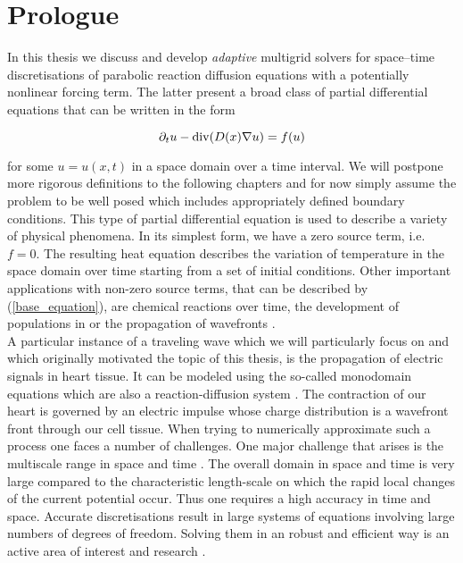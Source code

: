 \documentclass[../draft_1.tex]{subfiles}
\begin{document}
\chapter{Prologue}

In this thesis we  discuss and develop \textit{adaptive} multigrid solvers for space--time discretisations of parabolic reaction diffusion equations with a potentially nonlinear forcing term. The latter present a broad class of partial differential equations that can be written in the form
\begin{ceqn}
\begin{equation}
\label{base_equation}
\partial_t u - \mathop{}\!\mathrm{div} ( D(x) \nabla u) = f(u)
\end{equation}
\end{ceqn}
for some $u = u(x,t)$ in a space domain over a time interval. We will postpone more rigorous definitions to the following chapters and for now simply assume the problem to be well posed which includes appropriately defined boundary conditions. This type of partial differential equation is used to describe a variety of physical phenomena. In its simplest form, we have a zero source term, i.e. $f = 0$. The resulting heat equation describes the variation of temperature in the space domain over time starting from a set of initial conditions. Other important applications with non-zero source terms, that can be described by (\ref{base_equation}), are chemical reactions over time, the development of populations in \cite{cosner2008reaction} or the propagation of wavefronts \cite{zegeling2004adaptive}. 
\smallskip
\\
A particular instance of a traveling wave which we will particularly focus on and which originally motivated the topic of this thesis, is the propagation of electric signals in heart tissue. It can be modeled using the so-called monodomain equations which are also a reaction-diffusion system \cite{franzone2014mathematical}. The contraction of our heart is governed by an electric impulse whose charge distribution is a wavefront front through our cell tissue. When trying to numerically approximate such a process one faces a number of challenges. One major challenge that arises is the multiscale range in space and time \cite{colli2004parallel}. The overall domain in space and time is very large compared to the characteristic length-scale on which the rapid local changes of the current potential occur. Thus one requires a high accuracy in time and space. Accurate discretisations result in large systems of equations involving large numbers of degrees of freedom. Solving them in an robust and efficient way is an active area of interest and research \cite{hohmann2012numerical}. 
\end{document}
